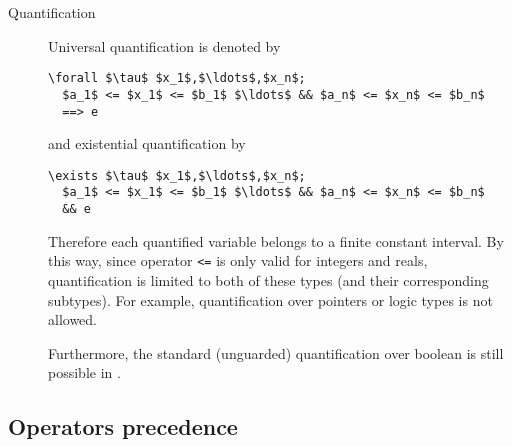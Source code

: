 \begin{description}
\item[Quantification] Universal quantification is denoted by
\begin{lstlisting}
\forall $\tau$ $x_1$,$\ldots$,$x_n$;
  $a_1$ <= $x_1$ <= $b_1$ $\ldots$ && $a_n$ <= $x_n$ <= $b_n$
  ==> e
\end{lstlisting} and existential quantification by
\begin{lstlisting}
\exists $\tau$ $x_1$,$\ldots$,$x_n$;
  $a_1$ <= $x_1$ <= $b_1$ $\ldots$ && $a_n$ <= $x_n$ <= $b_n$
  && e
\end{lstlisting}
Therefore each quantified variable belongs to a finite constant interval. By
this way, since operator \lstinline|<=| is only valid for integers and reals,
quantification is limited to both of these types (and their corresponding
subtypes). For example, quantification over \C pointers or logic types is not
allowed.

Furthermore, the standard \acsl (unguarded) quantification over boolean is still
possible in \eacsl.
\end{description}


\subsection{Operators precedence}
\nodiff

